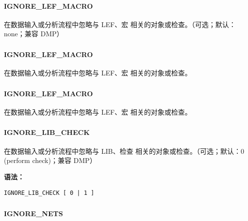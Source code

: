 \paragraph*{IGNORE_LEF_MACRO}

在数据输入或分析流程中忽略与 LEF、宏 相关的对象或检查。（可选；默认：none；兼容 DMP）

\subsubsection{}
\paragraph*{IGNORE_LEF_MACRO}

在数据输入或分析流程中忽略与 LEF、宏 相关的对象或检查。

\subsubsection{}
\paragraph*{IGNORE_LEF_MACRO}

在数据输入或分析流程中忽略与 LEF、宏 相关的对象或检查。

\subsubsection{}
\paragraph*{IGNORE_LIB_CHECK}

在数据输入或分析流程中忽略与 LIB、检查 相关的对象或检查。（可选；默认：0 (perform check)；兼容 DMP）

\textbf{语法：}
\begin{lstlisting}
IGNORE_LIB_CHECK [ 0 | 1 ]
\end{lstlisting}

\subsubsection{}
\paragraph*{IGNORE_NETS}

